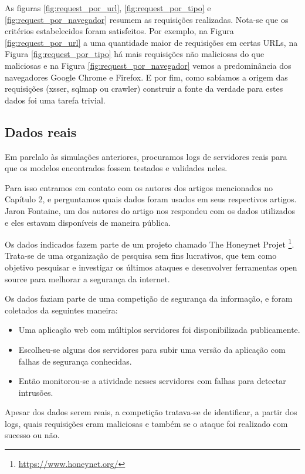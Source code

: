 As figuras \ref{fig:request_por_url}, \ref{fig:request_por_tipo} e \ref{fig:request_por_navegador} resumem 
as requisições realizadas. Nota-se que os critérios estabelecidos foram satisfeitos. Por exemplo, na
Figura \ref{fig:request_por_url} a uma quantidade maior de requisições em certas URLs, na Figura 
\ref{fig:request_por_tipo} há mais requisições não maliciosas do que maliciosas e 
na Figura \ref{fig:request_por_navegador} vemos a predominância dos navegadores Google Chrome e 
Firefox. E por fim, como 
sabíamos a origem das requisições (xsser, sqlmap ou crawler) construir a fonte da verdade para estes 
dados foi uma tarefa trivial.

\subsection{Dados reais}

Em parelalo às simulações anteriores, procuramos logs de servidores reais para que os modelos 
encontrados fossem testados e validades neles. 

Para isso entramos em contato com os autores dos artigos mencionados no Capítulo 2, e 
perguntamos quais dados foram usados em seus respectivos artigos. Jaron Fontaine, um dos autores
do artigo \cite{ref:art6} nos respondeu com os dados utilizados e eles estavam disponíveis de
maneira pública. 

Os dados indicados fazem parte de um projeto chamado The Honeynet Projet \footnote{\url{https://www.honeynet.org/}}. 
Trata-se de uma organização de pesquisa 
sem fins lucrativos, que tem como objetivo pesquisar e investigar os últimos ataques e desenvolver
ferramentas open source para melhorar a segurança da internet.

Os dados faziam parte de uma competição de segurança da informação, e foram coletados da seguintes maneira:

\begin{itemize}
    \item Uma aplicação web com múltiplos servidores foi disponibilizada publicamente.
    \item Escolheu-se alguns dos servidores para subir uma versão da aplicação 
    com falhas de segurança conhecidas.
    \item Então monitorou-se a atividade nesses servidores com falhas para detectar intrusões.
\end{itemize}

Apesar dos dados serem reais, a competição tratava-se de identificar, a partir dos logs, quais requisições 
eram maliciosas e também se o ataque foi realizado com sucesso ou não. 

